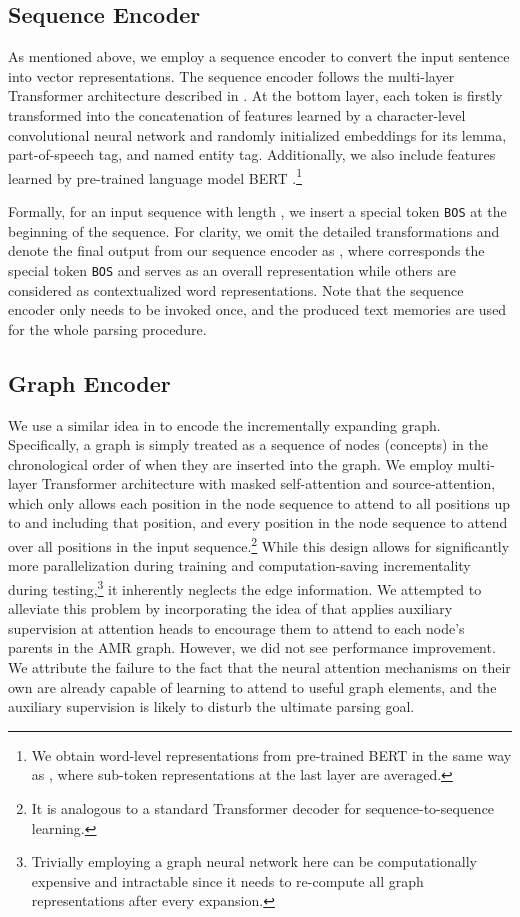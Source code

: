 \documentclass[11pt,a4paper]{article}
\begin{document}
	\subsection{Sequence Encoder}
	As mentioned above, we employ a sequence encoder to convert the input sentence into vector representations. The sequence encoder follows the multi-layer Transformer architecture described in . At the bottom layer, each token is firstly transformed into the concatenation of features learned by a character-level convolutional neural network \cite[charCNN,][]{kim2016character} and randomly initialized embeddings for its lemma, part-of-speech tag, and named entity tag. Additionally, we also include features learned by pre-trained language model BERT \cite{devlin-etal-2019-bert}.\footnote{We obtain word-level representations from pre-trained BERT in the same way as , where sub-token representations at the last layer are averaged.}
	
	Formally, for an input sequence  with length , we insert a special token \texttt{BOS} at the beginning of the sequence. For clarity, we omit the detailed transformations \cite{vaswani2017attention} and denote the final output from our sequence encoder as , where  corresponds the special token \texttt{BOS} and serves as an overall representation while others are considered as contextualized word representations. Note that the sequence encoder only needs to be invoked once, and the produced text memories are used for the whole parsing procedure.
	\subsection{Graph Encoder}
	We use a similar idea in  to encode the incrementally expanding graph. Specifically, a graph is simply treated as a sequence of nodes (concepts) in the chronological order of when they are inserted into the graph. We employ multi-layer Transformer architecture with masked self-attention and source-attention, which only allows each position in the node sequence to attend to all positions up to and including that position, and every position in the node sequence to attend over all positions in the input sequence.\footnote{It is analogous to a standard Transformer decoder \cite{vaswani2017attention} for sequence-to-sequence learning.} While this design allows for significantly more parallelization during training and computation-saving incrementality during testing,\footnote{Trivially employing a graph neural network here can be computationally expensive and intractable since it needs to re-compute all graph representations after every expansion.} it inherently neglects the edge information. We attempted to alleviate this problem by incorporating the idea of  that applies auxiliary supervision at attention heads to encourage them to attend to each node’s parents in the AMR graph. However, we did not see performance improvement. We attribute the failure to the fact that the neural attention mechanisms on their own are already capable of learning to attend to useful graph elements, and the auxiliary supervision is likely to disturb the ultimate parsing goal.
	
\end{document}

